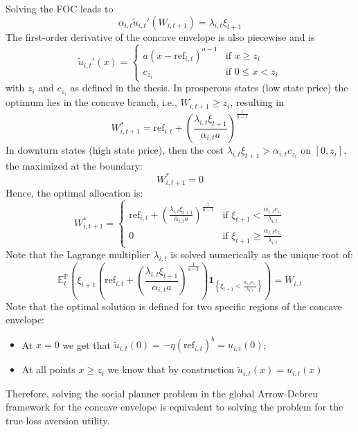 \documentclass[11pt,a4paper]{article}
\theoremstyle{definition}
\theoremstyle{plain}
\theoremstyle{remark}
\newcommand{\E}{\mathbb{E}}
\renewcommand{\P}{\mathbb{P}}
\newcommand{\1}{\mathbf{1}}
\begin{document}
Solving the FOC leads to
\begin{equation*}
    \alpha_{i,t} \tilde{u}_{i,t}'(W_{i,t+1}) = \lambda_{i,t} \xi_{t+1}
\end{equation*}
The first-order derivative of the concave envelope is also piecewise and is
\begin{equation*}
    \tilde{u}_{i,t}'(x) = \begin{cases} a(x - \text{ref}_{i,t})^{a-1} & \text{if } x \ge z_i \\ c_{z_i} & \text{if } 0 \le x < z_i \end{cases}
\end{equation*}
with $z_i$ and $c_{z_i}$ as defined in the thesis. In prosperous states (low state price) the optimum lies in the concave branch, i.e., $W_{i,t+1} \geq z_i$, resulting in
\begin{equation*}
    W_{i,t+1}^* = \text{ref}_{i,t} + \left( \frac{\lambda_{i,t} \xi_{t+1}}{\alpha_{i,t} a} \right)^{\frac{1}{a-1}}
\end{equation*}
In downturn states (high state price), then the cost $\lambda_{i,t} \xi_{t+1} > \alpha_{i,t} c_{z_i}$ on $[0, z_i]$, the maximized at the boundary:
\begin{equation*}
    W_{i,t+1}^* = 0
\end{equation*}
Hence, the optimal allocation is:
\begin{equation*}
    W_{i,t+1}^* = \begin{cases} \text{ref}_{i,t} + \left( \frac{\lambda_{i,t} \xi_{t+1}}{\alpha_{i,t} a} \right)^{\frac{1}{a-1}} & \text{if } \xi_{t+1} < \frac{\alpha_{i,t} c_{z_i}}{\lambda_{i,t}} \\ 0 & \text{if } \xi_{t+1} \ge \frac{\alpha_{i,t} c_{z_i}}{\lambda_{i,t}} \end{cases}
\end{equation*}
Note that the Lagrange multiplier $\lambda_{i,t}$ is solved numerically as the unique root of:
\begin{equation*}
    \E_t^\P\left( \xi_{t+1} \left( \text{ref}_{i,t} + \left( \frac{\lambda_{i,t} \xi_{t+1}}{\alpha_{i,t} a} \right)^{\frac{1}{a-1}} \right) \1_{\left\{\xi_{t+1} < \frac{\alpha_{i,t} c_{z_i}}{\lambda_{i,t}}\right\}} \right) = W_{i,t}
\end{equation*}
Note that the optimal solution is defined for two specific regions of the concave envelope:
\begin{itemize}
    \item At $x=0$ we get that $\tilde{u}_{i,t}(0) = - \eta (\text{ref}_{i,t})^b = u_{i,t}(0)$;
    \item At all points $x \geq z_i$ we know that by construction $\tilde{u}_{i,t}(x) = u_{i,t}(x)$
\end{itemize}
Therefore, solving the social planner problem in the global Arrow-Debreu framework for the concave envelope is equivalent to solving the problem for the true loss aversion utility.
\end{document}

